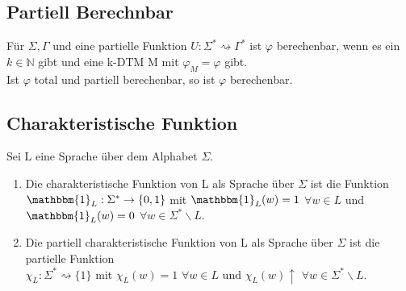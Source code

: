 \documentclass[DIV=15]{scrartcl}
\begin{document}
\subsection{Partiell Berechnbar}
    Für \(\Sigma,\Gamma\) und eine partielle Funktion \(U:\Sigma^*\rightsquigarrow\Gamma^*\) ist \(\varphi\) berechenbar, 
    wenn es ein \(k\in\mathbb{N}\) gibt und eine k-DTM M mit \(\varphi_M=\varphi\) gibt.\\
    Ist \(\varphi\) total und partiell berechenbar, so ist \(\varphi\) berechenbar.
\subsection{Charakteristische Funktion}
    Sei L eine Sprache über dem Alphabet \(\Sigma\).
    \begin{enumerate}
        \item Die charakteristische Funktion von L als Sprache über \(\Sigma\) ist die Funktion\\
        \(\mathbbm{1}_L:\Sigma^*\to\{0,1\}\) mit \(\mathbbm{1}_L(w)=1\) \(\forall w\in L\) und \(\mathbbm{1}_L(w)=0\) \(\forall w\in\Sigma^*\backslash L\).
        \item Die partiell charakteristische Funktion von L als Sprache über \(\Sigma\) ist die partielle Funktion\\
        \(\chi_L:\Sigma^*\rightsquigarrow\{1\}\) mit \(\chi_L(w)=1\) \(\forall w\in L\) und \(\chi_L(w)\uparrow\) \(\forall w\in\Sigma^*\backslash L\).
    \end{enumerate}
\end{document}
